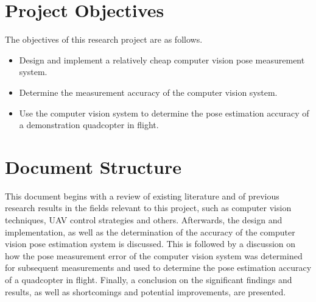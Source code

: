 \section{Project Objectives}

The objectives of this research project are as follows. 

\begin{itemize}
  \item Design and implement a relatively cheap computer vision pose measurement system.
  \item Determine the measurement accuracy of the computer vision system.
  \item Use the computer vision system to determine the pose estimation accuracy of a demonstration quadcopter in flight. 
\end{itemize}

\section{Document Structure}

This document begins with a review of existing literature and of previous research results in the fields relevant to this project, such as computer vision techniques, UAV control strategies and others. Afterwards, the design and implementation, as well as the determination of the accuracy of the computer vision pose estimation system is discussed. This is followed by a discussion on how the pose measurement error of the computer vision system was determined for subsequent measurements and used to determine the pose estimation accuracy of a quadcopter in flight. Finally, a conclusion on the significant findings and results, as well as shortcomings and potential improvements, are presented. 
